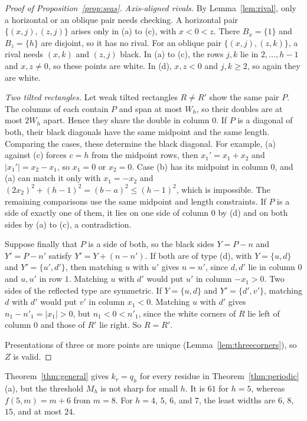 \begin{proof}[Proof of Proposition~\ref{prop:seas}]
\emph{Axis-aligned rivals.} By Lemma~\ref{lem:rival}, only a horizontal or an oblique pair needs
checking. A horizontal pair $\{(x,j),(z,j)\}$ arises only in (a) to (c), with $x<0<z$. There
$B_x=\{1\}$ and $B_z=\{h\}$ are disjoint, so it has no rival. For an oblique pair
$\{(x,j),(z,k)\}$, a rival needs $(x,k)$ and $(z,j)$ black. In (a) to (c), the rows $j,k$ lie
in $2,\dots,h-1$ and $x,z\ne0$, so these points are white. In (d), $x,z<0$ and $j,k\ge2$, so
again they are white.

\emph{Two tilted rectangles.} Let weak tilted rectangles $R\ne R'$ show the same pair $P$. The
columns of each contain $P$ and span at most $W_h$, so their doubles are at most $2W_h$ apart.
Hence they share the double in column $0$. If $P$ is a diagonal of both, their black diagonals
have the same midpoint and the same length. Comparing the cases, these determine the black
diagonal. For example, (a) against (c) forces $c=h$ from the midpoint rows, then $x_1'=x_1+x_2$
and $|x_1'|=x_2-x_1$, so $x_1=0$ or $x_2=0$. Case (b) has its midpoint in column $0$, and (a) can
match it only with $x_1=-x_2$ and $(2x_2)^2+(h-1)^2=(b-a)^2\le(h-1)^2$, which is impossible.
The remaining comparisons use the same midpoint and length constraints.
If $P$ is a side of exactly one of them, it lies on
one side of column $0$ by (d) and on both sides by (a) to (c), a contradiction.

Suppose finally that $P$ is a side of both, so the black sides $Y=P-n$ and $Y'=P-n'$ satisfy
$Y'=Y+(n-n')$. If both are of type (d), with $Y=\{u,d\}$ and $Y'=\{u',d'\}$, then matching $u$
with $u'$ gives $n=n'$, since $d,d'$ lie in column $0$ and $u,u'$ in row $1$. Matching $u$ with
$d'$ would put $u'$ in column $-x_1>0$. Two sides of the reflected type are symmetric. If
$Y=\{u,d\}$ and $Y'=\{d',v'\}$, matching $d$ with $d'$ would put $v'$ in column $x_1<0$. Matching
$u$ with $d'$ gives $n_1-n'_1=|x_1|>0$, but $n_1<0<n'_1$, since the white corners of $R$
lie left of column $0$ and those of $R'$ lie right. So $R=R'$.

Presentations of three or more points are unique (Lemma~\ref{lem:threecorners}), so $Z$ is
valid.
\end{proof}

Theorem~\ref{thm:general} gives $k_r=q_h$ for every residue in
Theorem~\ref{thm:periodic}(a), but the threshold $M_h$ is not sharp for small $h$.
It is $61$ for $h=5$, whereas $f(5,m)=m+6$ from $m=8$.
For $h=4$, $5$, $6$, and $7$, the least widths are $6$, $8$, $15$, and at most $24$.
